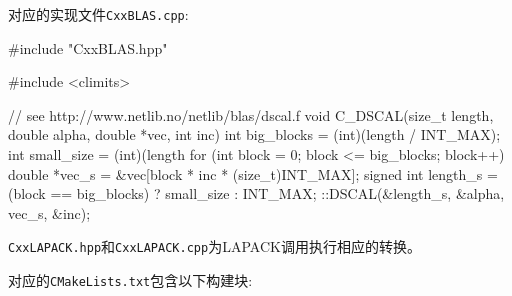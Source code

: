 对应的实现文件\texttt{CxxBLAS.cpp}:

\begin{codebox}[cpp]
#include "CxxBLAS.hpp"

#include <climits>

// see http://www.netlib.no/netlib/blas/dscal.f
void C_DSCAL(size_t length, double alpha, double *vec, int inc) {
  int big_blocks = (int)(length / INT_MAX);
  int small_size = (int)(length %
  for (int block = 0; block <= big_blocks; block++) {
    double *vec_s = &vec[block * inc * (size_t)INT_MAX];
    signed int length_s = (block == big_blocks) ? small_size : INT_MAX;
    ::DSCAL(&length_s, &alpha, vec_s, &inc);
  }
}
\end{codebox}

\texttt{CxxLAPACK.hpp}和\texttt{CxxLAPACK.cpp}为LAPACK调用执行相应的转换。


对应的\texttt{CMakeLists.txt}包含以下构建块:

